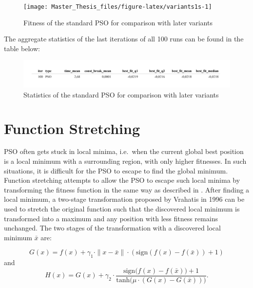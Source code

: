 \documentclass[
  oneside, a4paper, 12pt, openany]{book}
\theoremstyle{definition}
\theoremstyle{definition}
\theoremstyle{definition}
\theoremstyle{definition}
\theoremstyle{remark}
\begin{document}
\begin{figure}[H]
\texttt{[image: Master\_Thesis\_files/figure-latex/variants1s-1]} \caption{Fitness of the standard PSO for comparison with later variants}\label{fig:variants1s}
\end{figure}

The aggregate statistics of the last iterations of all 100 runs can be found in the table below:

\begin{figure}[H]
\includegraphics{Master_Thesis_files/figure-latex/variants2-1} \caption{Statistics of the standard PSO for comparison with later variants}\label{fig:variants2}
\end{figure}

\hypertarget{function-stretching}{%
\section{Function Stretching}\label{function-stretching}}

PSO often gets stuck in local minima, i.e.~when the current global best position is a local minimum with a surrounding region, with only higher fitnesses. In such situations, it is difficult for the PSO to escape to find the global minimum. Function stretching attempts to allow the PSO to escape such local minima by transforming the fitness function in the same way as described in \citep{PaVr2002}. After finding a local minimum, a two-stage transformation proposed by Vrahatis in 1996 can be used to stretch the original function such that the discovered local minimum is transformed into a maximum and any position with less fitness remains unchanged. The two stages of the transformation with a discovered local minimum \(\bar{x}\) are:

\begin{equation} 
G(x) = f(x) +  \gamma_1 \cdot \| x-\bar{x} \| \cdot (\text{sign}(f(x)-f(\bar{x}))+1)
\label{eq:fnstretchG}
\end{equation}
and
\begin{equation} 
  H(x) = G(x) + \gamma_2 \cdot \frac{\text{sign}\biggl(f(x)-f(\bar{x})\biggr)+1}{\text{tanh}\biggl( \mu \cdot (G(x)-G(\bar{x})) \biggr)}.
\label{eq:fnstretchH}
\end{equation}
\end{document}
